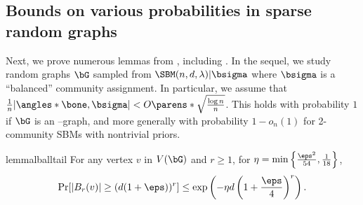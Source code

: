 \documentclass[11pt,letterpaper]{article}
\begin{document}
\subsection{Bounds on various probabilities in sparse random graphs}

Next, we prove numerous lemmas from , including .
In the sequel, we study random graphs $\bG$ sampled from $\SBM(n,d,\lambda)|\bsigma$ where $\bsigma$ is a ``balanced'' community assignment.
In particular, we assume that $\frac{1}{n}|\angles*{\bone,\bsigma}|<O\parens*{\sqrt{\frac{\log n}{n}}}$.
This holds with probability $1$ if $\bG$ is an \erdos--\renyi graph, and more generally with probability $1 - o_n(1)$ for 2-community SBMs with nontrivial priors.

\begin{restatable}{lemma}{lballtail}
    \label{lem:ball-tail}
    For any vertex $v$ in $V(\bG)$ and $r \ge 1$, for $\eta = \min\left\{ \frac{\eps^2}{54} , \frac{1}{18} \right\}$,
    \[
        \Pr[ |B_r(v)| \ge (d(1+\eps))^r] \le \exp\left( - \eta d \left( 1 + \frac{\eps}{4} \right)^{r} \right).
    \]
\end{restatable}
\end{document}
